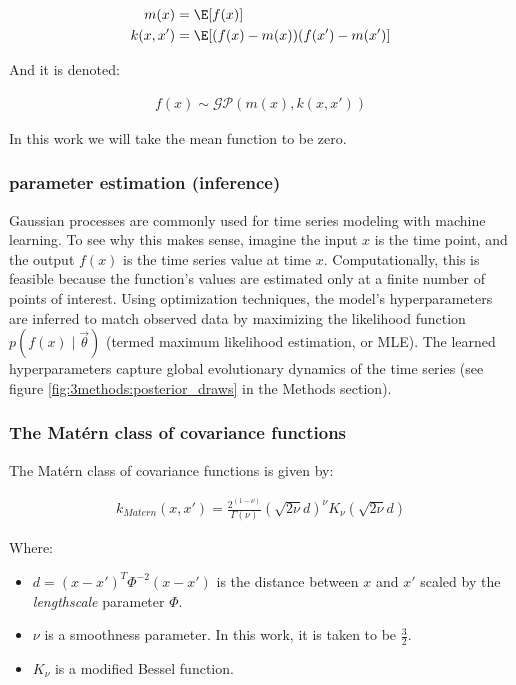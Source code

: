 \begin{align}
    m(x) &= \E[f(x)] \\
k(x,x') &= \E[(f(x)-m(x))(f(x')-m(x')]
\end{align}

And it is denoted:

\begin{align}
    f(x) \sim \mathcal{GP}(m(x), k(x,x'))
\end{align}

In this work we will take the mean function to be zero.

\subsubsection{parameter estimation (inference)}
Gaussian processes are commonly used for time series modeling with machine learning. To see why this makes sense, imagine the input $x$ is the time point, and the output $f(x)$ is the time series value at time $x$. Computationally, this is feasible because the function's values are estimated only at a finite number of points of interest.
Using optimization techniques, the model's hyperparameters are inferred to match observed data by maximizing the likelihood function $p(f(x) \mid \Vec{\theta})$ (termed maximum likelihood estimation, or MLE). The learned hyperparameters capture global evolutionary dynamics of the time series (see figure \ref{fig:3methods:posterior_draws} in the Methods section).

\subsubsection{The Matérn class of covariance functions}
The Matérn class of covariance functions is given by:

\begin{align}
    k_{Matern}(x,x') = \frac{2^{(1-\nu)}}{\Gamma(\nu)}(\sqrt{2\nu}d)^\nu K_\nu (\sqrt{2\nu}d)
\end{align}

Where:
\begin{itemize}
    \item $d = (x-x')^T \Phi^{-2} (x - x')$ is the distance between $x$ and $x'$ scaled by the \emph{lengthscale} parameter $\Phi$.
    \item $\nu$ is a smoothness parameter. In this work, it is taken to be $\frac{3}{2}$.
    \item $K_\nu$ is a modified Bessel function.
\end{itemize}

